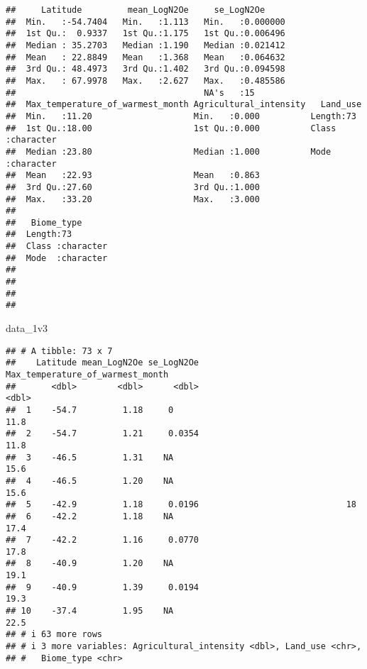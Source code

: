 \documentclass[
]{article}
\newenvironment{Shaded}{\begin{snugshade}}{\end{snugshade}}
\newcommand{\NormalTok}[1]{#1}
\begin{document}
\begin{verbatim}
##     Latitude         mean_LogN2Oe     se_LogN2Oe      
##  Min.   :-54.7404   Min.   :1.113   Min.   :0.000000  
##  1st Qu.:  0.9337   1st Qu.:1.175   1st Qu.:0.006496  
##  Median : 35.2703   Median :1.190   Median :0.021412  
##  Mean   : 22.8849   Mean   :1.368   Mean   :0.064632  
##  3rd Qu.: 48.4973   3rd Qu.:1.402   3rd Qu.:0.094598  
##  Max.   : 67.9978   Max.   :2.627   Max.   :0.485586  
##                                     NA's   :15        
##  Max_temperature_of_warmest_month Agricultural_intensity   Land_use        
##  Min.   :11.20                    Min.   :0.000          Length:73         
##  1st Qu.:18.00                    1st Qu.:0.000          Class :character  
##  Median :23.80                    Median :1.000          Mode  :character  
##  Mean   :22.93                    Mean   :0.863                            
##  3rd Qu.:27.60                    3rd Qu.:1.000                            
##  Max.   :33.20                    Max.   :3.000                            
##                                                                            
##   Biome_type       
##  Length:73         
##  Class :character  
##  Mode  :character  
##                    
##                    
##                    
## 
\end{verbatim}

\begin{Shaded}
\begin{Highlighting}[]
\NormalTok{data\_1v3}
\end{Highlighting}
\end{Shaded}

\begin{verbatim}
## # A tibble: 73 x 7
##    Latitude mean_LogN2Oe se_LogN2Oe Max_temperature_of_warmest_month
##       <dbl>        <dbl>      <dbl>                            <dbl>
##  1    -54.7         1.18     0                                  11.8
##  2    -54.7         1.21     0.0354                             11.8
##  3    -46.5         1.31    NA                                  15.6
##  4    -46.5         1.20    NA                                  15.6
##  5    -42.9         1.18     0.0196                             18  
##  6    -42.2         1.18    NA                                  17.4
##  7    -42.2         1.16     0.0770                             17.8
##  8    -40.9         1.20    NA                                  19.1
##  9    -40.9         1.39     0.0194                             19.3
## 10    -37.4         1.95    NA                                  22.5
## # i 63 more rows
## # i 3 more variables: Agricultural_intensity <dbl>, Land_use <chr>,
## #   Biome_type <chr>
\end{verbatim}
\end{document}
